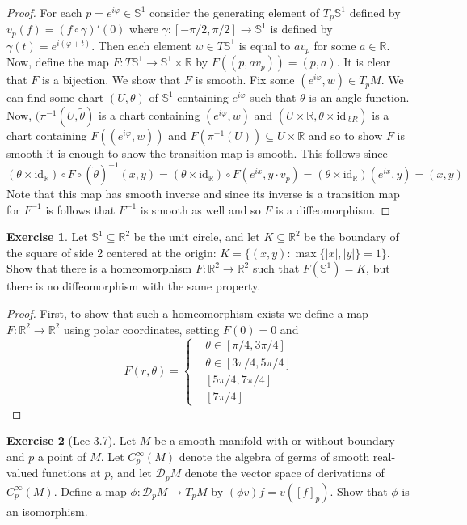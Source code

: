 \documentclass{article}
\newcommand{\bR}{\mathbb{R}}
\newcommand{\vp}{\varphi}
\newcommand{\bS}{\mathbb{S}}
\newcommand{\cD}{\mathcal{D}}
\theoremstyle{definition}
\newtheorem{exercise}{Exercise}
\begin{document}
\begin{proof}
    For each $p=e^{i \vp}\in \bS^1$ consider the generating element of $T_p \bS^1$ defined by $v_p(f) = (f \circ \gamma)'(0)$ where $\gamma: [-\pi/2, \pi/2] \to \bS^1$ is defined by $\gamma(t) = e^{i(\vp + t)}$. Then each element $w \in T\bS^1$ is equal to $av_p$ for some $a \in \bR$. Now, define the map $F: T\bS^1 \to \bS^1\times \bR$ by $F( (p, av_p)) = (p, a)$. It is clear that $F$ is a bijection.  We show that $F$ is smooth. Fix some $(e^{i \vp}, w) \in T_p M$. We can find some chart $(U, \theta)$ of $\bS^1$ containing $e^{i \vp}$ such that $\theta$ is an angle function. Now, $(\pi^{-1}(U, \tilde{\theta})$ is a chart containing $(e^{i\vp}, w)$ and $(U \times \bR, \theta \times \text{id}_{|bR})$ is a chart containing $F((e^{i\vp}, w))$ and $F(\pi^{-1}(U)) \subseteq U \times \bR$ and so to show $F$ is smooth it is enough to show the transition map is smooth. This follows since 
    \[ (\theta \times \text{id}_{\bR}) \circ F \circ (\tilde{\theta})^{-1}(x, y) = (\theta \times \text{id}_{\bR}) \circ F(e^{ix}, y \cdot v_p) = (\theta \times \text{id}_{\bR})(e^{ix}, y) = (x,y) \] 
    Note that this map has smooth inverse and since its inverse is a transition map for $F^{-1}$ is follows that $F^{-1}$ is smooth as well and so $F$ is a diffeomorphism. 
\end{proof}

\begin{exercise}
    Let $\bS^1 \subseteq \bR^2$ be the unit circle, and let $K \subseteq \bR^2$ be the boundary of the square of side 2 centered at the origin: $K = \{(x,y) \colon \max\{|x|, |y|\} = 1\}$. Show that there is a homeomorphism $F: \bR^2 \to \bR^2$ such that $F(\bS^1) = K$, but there is no diffeomorphism with the same property.  
\end{exercise}

\begin{proof}
    First, to show that such a homeomorphism exists we define a map $F:\bR^2 \to \bR^2$ using polar coordinates, setting $F(0)=0$ and 
    \[ F(r, \theta) = \begin{cases} & \theta \in [\pi/4, 3\pi/4] \\ & \theta \in [3\pi/4, 5\pi/4] \\ & [5 \pi/4, 7 \pi/4] \\ & [7\pi/4] \end{cases} \]
\end{proof}

\begin{exercise}[Lee 3.7]
    Let $M$ be a smooth manifold with or without boundary and $p$ a point of $M$. Let $C_p^{\infty}(M)$ denote the algebra of germs of smooth real-valued functions at $p$, and let $\cD_pM$ denote the vector space of derivations of $C_p^{\infty}(M)$. Define a map $\phi: \cD_pM \to T_pM$ by $(\phi v)f = v([f]_p)$. Show that $\phi$ is an isomorphism.
\end{exercise}
\end{document}
